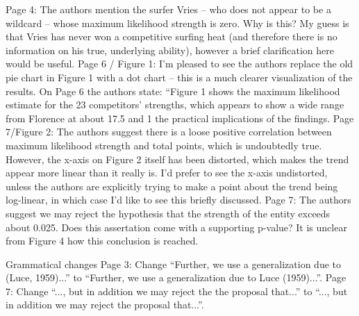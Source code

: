 \documentclass[12pt]{article}
\begin{document}
Page 4: The authors mention the surfer Vries – who does not appear to be a wildcard – whose
maximum likelihood strength is zero. Why is this? My guess is that Vries has never won a competitive
surfing heat (and therefore there is no information on his true, underlying ability), however a brief
clarification here would be useful.
Page 6 / Figure 1: I’m pleased to see the authors replace the old pie chart in Figure 1 with a dot chart
– this is a much clearer visualization of the results. On Page 6 the authors state: “Figure 1 shows the
maximum likelihood estimate for the 23 competitors’ strengths, which appears to show a wide range
from Florence at about 17.5%
and 1%
the practical implications of the findings.
Page 7/Figure 2: The authors suggest there is a loose positive correlation between maximum likelihood
strength and total points, which is undoubtedly true. However, the x-axis on Figure 2 itself has been
distorted, which makes the trend appear more linear than it really is. I’d prefer to see the x-axis
undistorted, unless the authors are explicitly trying to make a point about the trend being log-linear,
in which case I’d like to see this briefly discussed.
Page 7: The authors suggest we may reject the hypothesis that the strength of the entity exceeds
about 0.025. Does this assertation come with a supporting p-value? It is unclear from Figure 4 how
this conclusion is reached.

Grammatical changes
Page 3: Change “Further, we use a generalization due to (Luce, 1959)...” to “Further, we use a
generalization due to Luce (1959)...”.
Page 7: Change “..., but in addition we may reject the the proposal that...” to “..., but in addition we
may reject the proposal that...”.
\end{document}
